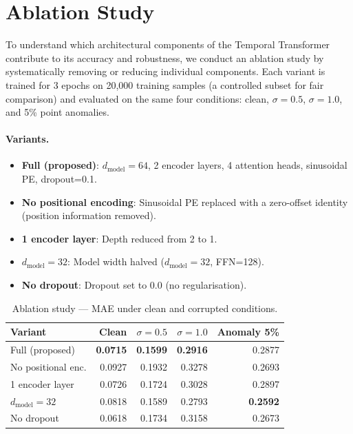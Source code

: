 \documentclass[runningheads]{llncs}
\begin{document}
\section{Ablation Study}
\label{sec:ablation}

To understand which architectural components of the Temporal Transformer contribute to its accuracy and robustness, we conduct an ablation study by systematically removing or reducing individual components. Each variant is trained for 3 epochs on 20,000 training samples (a controlled subset for fair comparison) and evaluated on the same four conditions: clean, $\sigma=0.5$, $\sigma=1.0$, and 5\% point anomalies.

\paragraph{Variants.}
\begin{itemize}
  \item \textbf{Full (proposed)}: $d_\text{model}=64$, 2 encoder layers, 4 attention heads, sinusoidal PE, dropout=0.1.
  \item \textbf{No positional encoding}: Sinusoidal PE replaced with a zero-offset identity (position information removed).
  \item \textbf{1 encoder layer}: Depth reduced from 2 to 1.
  \item \textbf{$d_\text{model}=32$}: Model width halved ($d_\text{model}=32$, FFN=128).
  \item \textbf{No dropout}: Dropout set to 0.0 (no regularisation).
\end{itemize}

\begin{table}[H]
\centering
\caption{Ablation study — MAE under clean and corrupted conditions.}
\label{tab:ablation}
\begin{tabular}{lrrrr}
\toprule
\textbf{Variant} & \textbf{Clean} & $\sigma=0.5$ & $\sigma=1.0$ & \textbf{Anomaly 5\%} \\
\midrule
Full (proposed)       & \textbf{0.0715} & \textbf{0.1599} & \textbf{0.2916} & 0.2877 \\
No positional enc.    & 0.0927 & 0.1932 & 0.3278 & 0.2693 \\
1 encoder layer       & 0.0726 & 0.1724 & 0.3028 & 0.2897 \\
$d_\text{model}=32$   & 0.0818 & 0.1589 & 0.2793 & \textbf{0.2592} \\
No dropout            & 0.0618 & 0.1734 & 0.3158 & 0.2673 \\
\bottomrule
\end{tabular}
\end{table}
\end{document}
